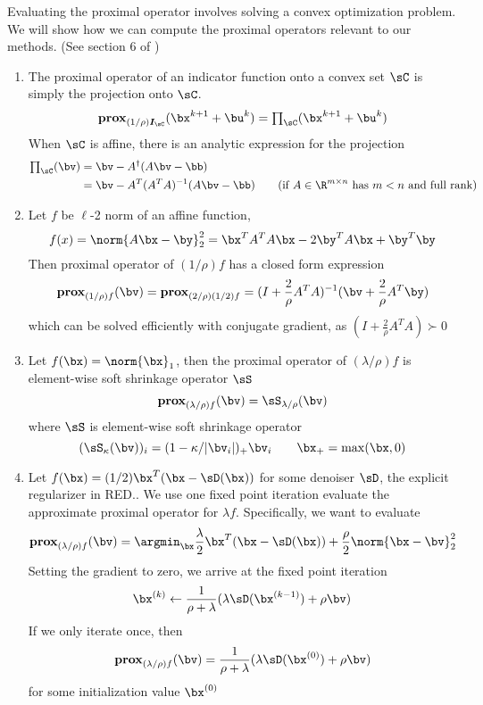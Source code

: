 \documentclass[11pt]{article}
\renewcommand{\sI}{\boldsymbol{I}}
\newcommand{\prox}{\textbf{prox}}
\begin{document}
Evaluating the proximal operator involves solving a convex optimization problem. We will show how we can compute the proximal operators relevant to our methods. (See section 6 of \cite{parikhProximalAlgorithms2014}) 
\begin{enumerate}
    \item The proximal operator of an indicator function onto a convex set $\sC$ is simply the projection onto $\sC$. 
    \[
        \prox_{(1/\rho)\sI_{\sC}}(\bx^{k+1} + \bu^k) =  \textstyle\prod_{\sC}(\bx^{k+1}+\bu^k)
    \]
    When $\sC$ is affine, there is an analytic expression for the projection
    \begin{align*}
        \textstyle\prod_{\sC}(\bv) 
            &= \bv - A^{\dagger}(A\bv-\bb)  \\
            &= \bv - A^T(A^TA)^{-1}(A\bv-\bb) \tag{if $A\in\R^{m\times n}$ has $m<n$ and full rank}
    \end{align*}
    \item Let $f$ be $\ell$-2 norm of an affine function, 
    \[
        f(x) = \norm{A\bx-\by}_2^2 = \bx^TA^TA\bx - 2\by^TA\bx + \by^T\by
    \]
    Then proximal operator of $(1/\rho)f$ has a closed form expression
    \[
        \prox_{(1/\rho)f}(\bv) 
            = \prox_{(2/\rho)(1/2)f}
            = (I + \frac{2}{\rho} A^TA)^{-1} (\bv + \frac{2}{\rho} A^T \by)
    \]
    which can be solved efficiently with conjugate gradient, as $(I + \frac{2}{\rho} A^TA) \succ 0$
    \item Let $f(\bx) = \norm{\bx}_1$, then the proximal operator of $(\lambda/\rho) f$ is element-wise soft shrinkage operator $\sS$
    \[
        \prox_{(\lambda/\rho)f}(\bv) 
            = \sS_{\lambda/\rho}(\bv)
    \]
    where $\sS$ is element-wise soft shrinkage operator
    \[
        (\sS_{\kappa}(\bv))_i
            = (1-\kappa/|\bv_i|)_{+}\bv_i
        \quad\quad
        \bx_{+} = \max(\bx,0)
    \]
    \item Let $f(\bx) = (1/2)\bx^T(\bx-\sD(\bx))$ for some denoiser $\sD$, the explicit regularizer in RED.\cite{romanoLittleEngineThat2016}. We use one fixed point iteration evaluate the approximate proximal operator for $\lambda f$. Specifically, we want to evaluate 
    \[
        \prox_{(\lambda/\rho)f} (\bv)
            = \argmin_{\bx} \frac{\lambda}{2}\bx^T(\bx-\sD(\bx)) + \frac{\rho}{2} \norm{\bx-\bv}_2^2
    \]
    Setting the gradient to zero, we arrive at the fixed point iteration
    \[
        \bx^{(k)} \leftarrow \frac{1}{\rho+\lambda}(
            \lambda \sD(\bx^{(k-1)}) + \rho \bv
        )
    \]
    If we only iterate once, then 
    \[
        \prox_{(\lambda/\rho)f} (\bv)
            = \frac{1}{\rho+\lambda}( \lambda \sD(\bx^{(0)}) + \rho \bv )
    \]
    for some initialization value $\bx^{(0)}$
\end{enumerate}
\end{document}
